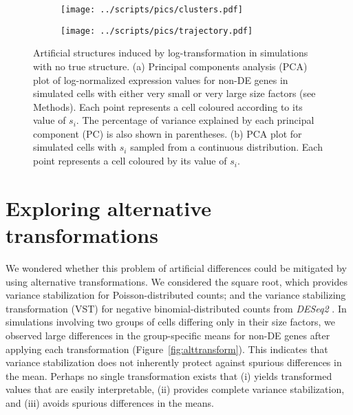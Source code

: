 \documentclass[10pt,letterpaper]{article}
\begin{document}
\begin{figure}[btp]
\centering
\begin{subfigure}[b]{0.49\textwidth}
    \texttt{[image: ../scripts/pics/clusters.pdf]}
    \caption{}
\end{subfigure}
\begin{subfigure}[b]{0.49\textwidth}
    \texttt{[image: ../scripts/pics/trajectory.pdf]}
    \caption{}
\end{subfigure}
\caption{Artificial structures induced by log-transformation in simulations with no true structure.
(a) Principal components analysis (PCA) plot of log-normalized expression values for non-DE genes in simulated cells with either very small or very large size factors (see Methods).
Each point represents a cell coloured according to its value of $s_i$.
The percentage of variance explained by each principal component (PC) is also shown in parentheses. 
(b) PCA plot for simulated cells with $s_i$ sampled from a continuous distribution.
Each point represents a cell coloured by its value of $s_i$.
}
\label{fig:structures}
\end{figure}

\section{Exploring alternative transformations}
We wondered whether this problem of artificial differences could be mitigated by using alternative transformations.
We considered the square root, which provides variance stabilization for Poisson-distributed counts;
and the variance stabilizing transformation (VST) for negative binomial-distributed counts from \emph{DESeq2} \cite{love2014moderated}.
In simulations involving two groups of cells differing only in their size factors, we observed large differences in the group-specific means for non-DE genes after applying each transformation (Figure~\ref{fig:alttransform}).
This indicates that variance stabilization does not inherently protect against spurious differences in the mean.
Perhaps no single transformation exists that 
(i) yields transformed values that are easily interpretable,
(ii) provides complete variance stabilization, and
(iii) avoids spurious differences in the means.
\end{document}
